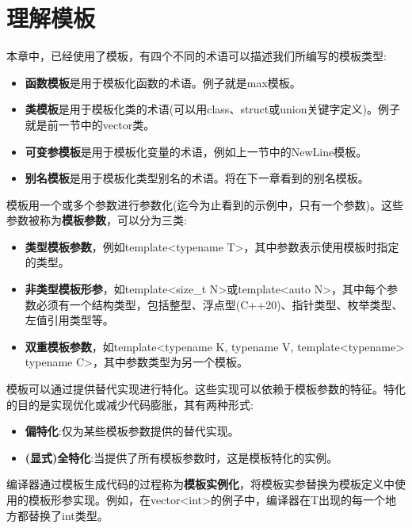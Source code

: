 \section{理解模板}
本章中，已经使用了模板，有四个不同的术语可以描述我们所编写的模板类型:

\begin{itemize}
\item
\textbf{函数模板}是用于模板化函数的术语。例子就是max模板。

\item
\textbf{类模板}是用于模板化类的术语(可以用class、struct或union关键字定义)。例子就是前一节中的vector类。

\item
\textbf{可变参模板}是用于模板化变量的术语，例如上一节中的NewLine模板。

\item
\textbf{别名模板}是用于模板化类型别名的术语。将在下一章看到的别名模板。
\end{itemize}

模板用一个或多个参数进行参数化(迄今为止看到的示例中，只有一个参数)。这些参数被称为\textbf{模板参数}，可以分为三类:

\begin{itemize}
\item
\textbf{类型模板参数}，例如template<typename T>，其中参数表示使用模板时指定的类型。

\item
\textbf{非类型模板形参}，如template<size\_t N>或template<auto N>，其中每个参数必须有一个结构类型，包括整型、浮点型(C++20)、指针类型、枚举类型、左值引用类型等。

\item
\textbf{双重模板参数}，如template<typename K, typename V, template<typename> typename C>，其中参数类型为另一个模板。
\end{itemize}

模板可以通过提供替代实现进行特化。这些实现可以依赖于模板参数的特征。特化的目的是实现优化或减少代码膨胀，其有两种形式:

\begin{itemize}
\item
\textbf{偏特化}:仅为某些模板参数提供的替代实现。

\item
\textbf{(显式)全特化}:当提供了所有模板参数时，这是模板特化的实例。
\end{itemize}

编译器通过模板生成代码的过程称为\textbf{模板实例化}，将模板实参替换为模板定义中使用的模板形参实现。例如，在vector<int>的例子中，编译器在T出现的每一个地方都替换了int类型。

